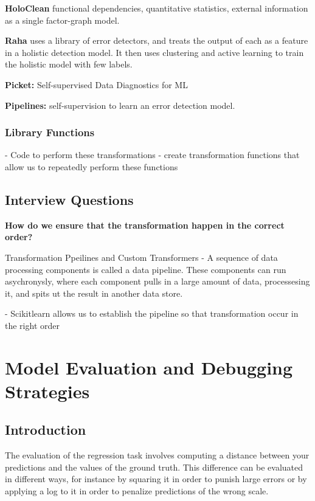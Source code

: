 \documentclass[openany]{book}
\begin{document}
\textbf{HoloClean} functional dependencies, quantitative statistics, external information as a single factor-graph model.

\textbf{Raha} uses a library of error detectors, and treats the output of each as a feature in a holistic detection model. It then uses clustering and active learning to train the holistic model with few labels.

\textbf{Picket:} Self-supervised Data Diagnostics for ML 

\textbf{Pipelines:} self-supervision to learn an error detection model.


\subsection{Library Functions}

- Code to perform these transformations
- create transformation functions that allow us to repeatedly perform these functions 


\section{Interview Questions}




\textbf{How do we ensure that the transformation happen in the correct order? }




Transformation Ppeilines and Custom Transformers 
- A sequence of data processing components is called a data pipeline. 
These components can run asychronysly, where each component pulls in a large amount of data, processesing it, and spits ut the result in another data store. 

- Scikitlearn allows us to establish the pipeline so that transformation occur in the right order




\chapter{Model Evaluation and Debugging Strategies}



\section{Introduction}

The evaluation of the regression task involves computing a distance between your predictions and the values of the ground truth. This difference can be evaluated in different ways, for instance by squaring it in order to punish large errors or by applying a log to it in order to penalize predictions of the wrong scale. 
\end{document}
